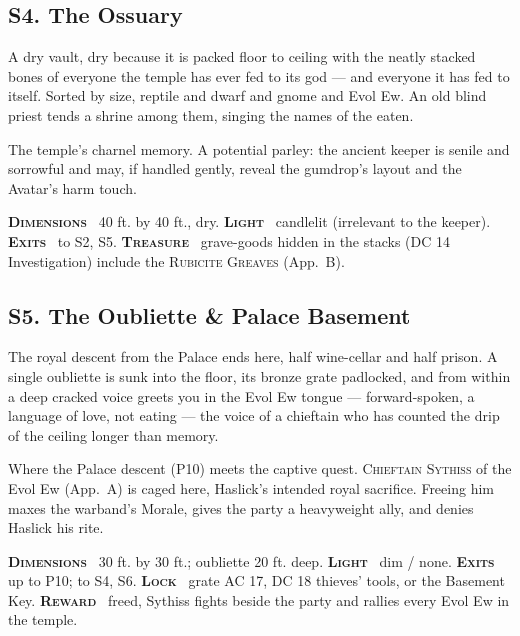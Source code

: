 \documentclass[10pt,twoside]{article}
\newcommand{\tech}[1]{\textbf{\scshape\textcolor{stone}{#1}}\ }
\newcommand{\eqname}[1]{\textsc{#1}}
\begin{document}
\subsection{S4. The Ossuary}
\begin{readaloud}
A dry vault, dry because it is packed floor to ceiling with the neatly stacked bones
of everyone the temple has ever fed to its god --- and everyone it has fed to itself.
Sorted by size, reptile and dwarf and gnome and Evol Ew. An old blind priest tends a
shrine among them, singing the names of the eaten.
\end{readaloud}
The temple's charnel memory. A potential parley: the ancient keeper is senile and
sorrowful and may, if handled gently, reveal the gumdrop's layout and the Avatar's
harm touch.

\begin{techbox}
\tech{Dimensions} 40 ft. by 40 ft., dry. \tech{Light} candlelit (irrelevant to the
keeper). \tech{Exits} to S2, S5. \tech{Treasure} grave-goods hidden in the stacks
(DC 14 Investigation) include the \eqname{Rubicite Greaves} (App.\ B).
\end{techbox}

\subsection{S5. The Oubliette \& Palace Basement}
\begin{readaloud}
The royal descent from the Palace ends here, half wine-cellar and half prison. A
single oubliette is sunk into the floor, its bronze grate padlocked, and from within
a deep cracked voice greets you in the Evol Ew tongue --- forward-spoken, a language
of love, not eating --- the voice of a chieftain who has counted the drip of the
ceiling longer than memory.
\end{readaloud}
Where the Palace descent (P10) meets the captive quest. \eqname{Chieftain Sythiss} of
the Evol Ew (App.\ A) is caged here, Haslick's intended royal sacrifice. Freeing him
maxes the warband's Morale, gives the party a heavyweight ally, and denies Haslick his
rite.

\begin{techbox}
\tech{Dimensions} 30 ft. by 30 ft.; oubliette 20 ft. deep. \tech{Light} dim / none.
\tech{Exits} up to P10; to S4, S6. \tech{Lock} grate AC 17, DC 18 thieves' tools, or
the Basement Key. \tech{Reward} freed, Sythiss fights beside the party and rallies
every Evol Ew in the temple.
\end{techbox}
\end{document}
